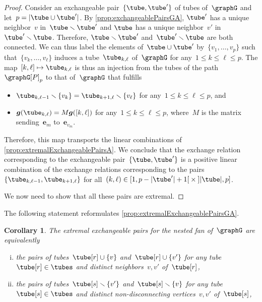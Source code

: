 \documentclass{amsart}
\newtheorem{corollary}[theorem]{Corollary}
\theoremstyle{definition}
\renewcommand{\b}[1]{{\boldsymbol{#1}}} %
\newcommand{\ssm}{\smallsetminus} %
\newcommand{\vincent}[1]{\todo[color=blue!30]{#1 \\ \hfill --- V.}}
\newcommand{\gvector}[1]{\b{g}(#1)} %
\begin{document}
\begin{proof}
Consider an exchangeable pair~$\{\tube, \tube'\}$ of tubes of~$\graphG$ and let~$p = |\tube \cup \tube'|$.
By \cref{prop:exchangeablePairsGA}, $\tube'$ has a unique neighbor~$v$ in~$\tube \ssm \tube'$ and $\tube$ has a unique neighbor~$v'$ in~$\tube' \ssm \tube$.
Therefore, $\tube \ssm \tube'$ and~$\tube' \ssm \tube$ are both connected.
We can thus label the elements of~$\tube \cup \tube'$ by~$\{v_1, \dots, v_p\}$ such that~$\{v_k, \dots, v_\ell\}$ induces a tube~$\tube_{k,\ell}$ of~$\graphG$ for any~$1 \le k \le \ell \le p$. 
The map~$[k,\ell] \mapsto \tube_{k,\ell}$ is thus an injection from the tubes of the path~$\graphG[P]_p$ to that of~$\graphG$ that fulfills
\begin{itemize}
\item $\tube_{k,\ell-1} \ssm \{v_k\} = \tube_{k+1,\ell} \ssm \{v_\ell\}$ for any~$1 \le k \le \ell \le p$, and
\item $\gvector{\tube_{k,\ell}} = M\gvector{[k,\ell]}$ for any~$1 \le k \le \ell \le p$, where~$M$ is the matrix sending~$\b{e}_m$ to~$\b{e}_{v_m}$.
\end{itemize}
Therefore, this map transports the linear combinations of \cref{prop:extremalExchangeablePairsA}.
We conclude that the exchange relation corresponding to the exchangeable pair~$\{\tube, \tube'\}$ is a positive linear combination of the exchange relations corresponding to the pairs~$\{\tube_{k,\ell-1}, \tube_{k+1,\ell}\}$ for all~${(k,\ell) \in {[1, p-|\tube'|+1[} \times {]|\tube|, p]}}$.

We now need to show that all these pairs are extremal.
\vincent{TODO}
\end{proof}

The following statement reformulates \cref{prop:extremalExchangeablePairsGA}.

\begin{corollary}
\label{coro:extremalExchangeablePairsGA}
The extremal exchangeable pairs for the nested fan of~$\graphG$ are equivalently
\begin{enumerate}[(i)]
\item the pairs of tubes~$\tube[r] \cup \{v\}$ and~$\tube[r] \cup \{v'\}$ for any tube~$\tube[r] \in \tubes$ and distinct neighbors~$v,v'$ of~$\tube[r]$,
\item the pairs of tubes~$\tube[s] \ssm \{v'\}$ and~$\tube[s] \ssm \{v\}$ for any tube~$\tube[s] \in \tubes$ and distinct non-disconnecting vertices~$v,v'$ of~$\tube[s]$,
\end{enumerate}
\end{corollary}
\end{document}
